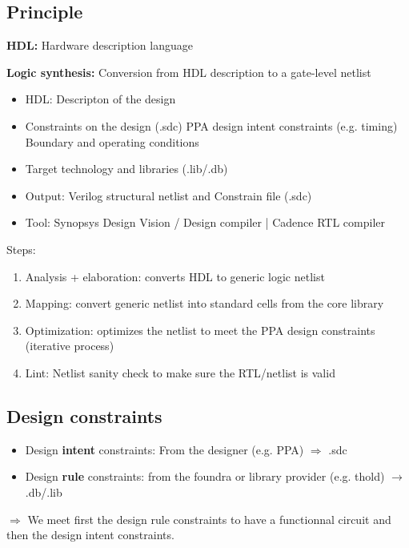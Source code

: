 
\subsection{Principle}

\textbf{HDL:} Hardware description language

\textbf{Logic synthesis:} Conversion from HDL description to a gate-level netlist
\begin{itemize}
  \item HDL: Descripton of the design
  \item Constraints on the design (.sdc)
    \subitem PPA design intent constraints (e.g. timing)
    \subitem Boundary and operating conditions
  \item Target technology and libraries (.lib/.db)
  \item Output: Verilog structural netlist and Constrain file (.sdc)
    \item Tool: Synopsys Design Vision / Design compiler | Cadence RTL compiler
\end{itemize}

Steps:
\begin{enumerate}
  \item Analysis + elaboration: converts HDL to generic logic netlist
  \item Mapping: convert generic netlist into standard cells from the core library
  \item Optimization: optimizes the netlist to meet the PPA design constraints (iterative process)
  \item Lint: Netlist sanity check to make sure the RTL/netlist is valid
\end{enumerate}



\subsection{Design constraints}
\begin{itemize}
  \item Design \textbf{intent} constraints: From the designer (e.g. PPA) \(\Rightarrow\) .sdc
  \item Design \textbf{rule} constraints: from the foundra or library provider (e.g. thold) \(\rightarrow\) .db/.lib
\end{itemize}

\(\Rightarrow\) We meet first the design rule constraints to have a functionnal circuit and then the design intent constraints.


